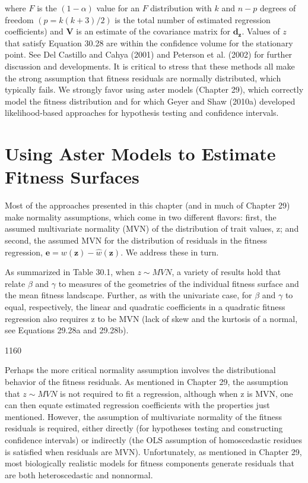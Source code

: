 \documentclass{article}
\begin{document}
where $F$ is the $(1-\alpha)$ value for an $F$ distribution with $k$ and $n-p$ degrees of freedom $(p=k(k+3)/2)$ is the total number of estimated regression coefficients) and $\mathbf{V}$ is an estimate of the covariance matrix for $\mathbf{d}_{\mathbf{z}}$. Values of $z$ that satisfy Equation 30.28 are within the confidence volume for the stationary point. See Del Castillo and Cahya (2001) and Peterson et al. (2002) for further discussion and developments. It is critical to stress that these methods all make the strong assumption that fitness residuals are normally distributed, which typically fails. We strongly favor using aster models (Chapter 29), which correctly model the fitness distribution and for which Geyer and Shaw (2010a) developed likelihood-based approaches for hypothesis testing and confidence intervals.

\section{Using Aster Models to Estimate Fitness Surfaces}
Most of the approaches presented in this chapter (and in much of Chapter 29) make normality assumptions, which come in two different flavors: first, the assumed multivariate normality (MVN) of the distribution of trait values, z; and second, the assumed MVN for the distribution of residuals in the fitness regression,  $ \mathbf{e} = w(\mathbf{z}) - \widehat{w}(\mathbf{z}) $. We address these in turn.

As summarized in Table 30.1, when  $ z \sim MVN $, a variety of results hold that relate  $ \beta $ and  $ \gamma $ to measures of the geometries of the individual fitness surface and the mean fitness landscape. Further, as with the univariate case, for  $ \beta $ and  $ \gamma $ to equal, respectively, the linear and quadratic coefficients in a quadratic fitness regression also requires z to be MVN (lack of skew and the kurtosis of a normal, see Equations 29.28a and 29.28b).

1160

Perhaps the more critical normality assumption involves the distributional behavior of the fitness residuals. As mentioned in Chapter 29, the assumption that  $ z \sim MVN $ is not required to fit a regression, although when z is MVN, one can then equate estimated regression coefficients with the properties just mentioned. However, the assumption of multivariate normality of the fitness residuals is required, either directly (for hypotheses testing and constructing confidence intervals) or indirectly (the OLS assumption of homoscedastic residues is satisfied when residuals are MVN). Unfortunately, as mentioned in Chapter 29, most biologically realistic models for fitness components generate residuals that are both heteroscedastic and nonnormal.
\end{document}
